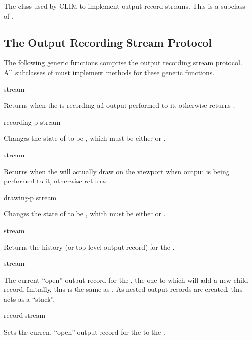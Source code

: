 The class used by CLIM to implement output record streams.  This is a subclass
of .
\Mutable


\subsection {The Output Recording Stream Protocol}

The following generic functions comprise the output recording stream protocol.
All subclasses of  must implement methods for these
generic functions.

 {stream}

Returns  when the   is
recording all output performed to it, otherwise returns .

 {recording-p stream}

Changes the state of  to be , which must
be either  or .

 {stream}

Returns  when the   will
actually draw on the viewport when output is being performed to it, otherwise
returns .

 {drawing-p stream}

Changes the state of  to be , which must
be either  or .

 {stream}

Returns the history (or top-level output record) for the  .

 {stream}

The current ``open'' output record for the 
, the one to which  will add a new
child record.  Initially, this is the same as .  As
nested output records are created, this acts as a ``stack''.

 {record stream}

Sets the current ``open'' output record for the 
 to the  .

